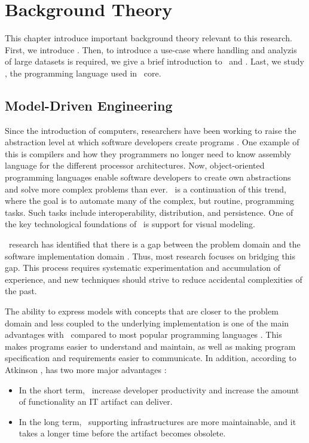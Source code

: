 \chapter{Background Theory}
\label{chap:background}
This chapter introduce important background theory relevant to this research. First, we introduce \mde. Then, to introduce a use-case where handling and analyzis of large datasets is required, we give a brief introduction to \bi~and \bd. Last, we study \delphi, the programming language used in \gap~core.

\clearpage


\section{Model-Driven Engineering}
\label{sec:Model-Driven Engineering}
Since the introduction of computers, researchers have been working to raise the abstraction level at which software developers create programs \cite{Atkinson2003-wr}. One example of this is compilers and how they programmers no longer need to know assembly language for the different processor architectures. Now, object-oriented programming languages enable software developers to create own abstractions and solve more complex problems than ever. \mde~is a continuation of this trend, where the goal is to automate many of the complex, but routine, programming tasks. Such tasks include interoperability, distribution, and persistence. One of the key technological foundations of \mde~is support for visual modeling.

\mde~research has identified that there is a gap between the problem domain and the software implementation domain \cite{France2007-ae}. Thus, most research focuses on bridging this gap. This process requires systematic experimentation and accumulation of experience, and new techniques should strive to reduce accidental complexities of the past.

The ability to express models with concepts that are closer to the problem domain and less coupled to the underlying implementation is one of the main advantages with \mde~compared to most popular programming languages \cite{Selic2003-qa}. This makes programs easier to understand and maintain, as well as making program specification and requirements easier to communicate.  In addition, according to Atkinson \ea, \mde has two more major advantages \cite{Atkinson2003-wr}:
\begin{itemize}
    \item In the short term, \mde~increase developer productivity and increase the amount of functionality an IT artifact can deliver.
    \item In the long term, \mdd~supporting infrastructures are more maintainable, and it takes a longer time before the artifact becomes obsolete.
\end{itemize}

